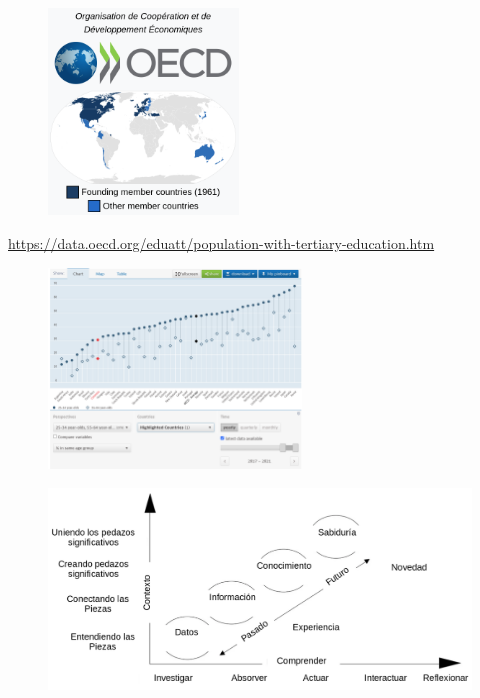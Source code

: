 \documentclass[aspectratio=169]{beamer}
\begin{document}
\begin{frame}
\begin{figure}
\centering
\includegraphics[width=0.45\textwidth]{oecd.png}
\end{figure}
\end{frame} 

\begin{frame}
\url{https://data.oecd.org/eduatt/population-with-tertiary-education.htm}
\begin{figure}
\centering
\includegraphics[width=0.6\textwidth]{OECD3.png}
\end{figure}
\end{frame} 

\begin{frame}
\begin{figure}
\includegraphics[width=.95\textwidth]{jerarquia.png}
\end{figure}       
\end{frame}
\end{document}

